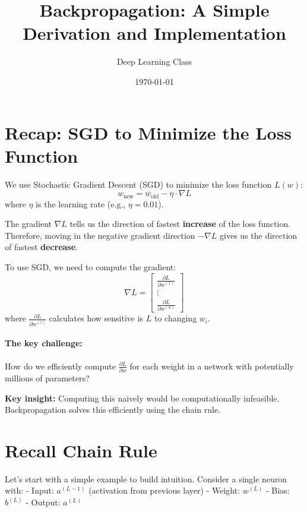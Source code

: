 \documentclass{article}
\title{Backpropagation: A Simple Derivation and Implementation}
\author{Deep Learning Class}
\date{\today}
\begin{document}
\maketitle

\section{Recap: SGD to Minimize the Loss Function}

We use Stochastic Gradient Descent (SGD) to minimize the loss function $L(w)$:
\begin{equation}
    w_{\text{new}} = w_{\text{old}} - \eta \cdot \nabla L
\end{equation}
where $\eta$ is the learning rate (e.g., $\eta = 0.01$).

The gradient $\nabla L$ tells us the direction of fastest \textbf{increase} of the loss function. Therefore, moving in the negative gradient direction $-\nabla L$ gives us the direction of fastest \textbf{decrease}.

To use SGD, we need to compute the gradient:
\begin{equation}
    \nabla L = \begin{bmatrix}
        \frac{\partial L}{\partial w^{(1)}} \\
        \vdots \\
        \frac{\partial L}{\partial w^{(n)}}
    \end{bmatrix}
\end{equation}
where $\frac{\partial L}{\partial w^{(i)}}$ calculates how sensitive is $L$ to changing $w_i$.

\paragraph{The key challenge:} How do we efficiently compute $\frac{\partial L}{\partial w}$ for each weight in a network with potentially millions of parameters? 



\textbf{Key insight:} Computing this naively would be computationally infeasible. Backpropagation solves this efficiently using the chain rule.

\section{Recall Chain Rule}

Let's start with a simple example to build intuition. Consider a single neuron with:
- Input: $a^{(L-1)}$ (activation from previous layer)
- Weight: $w^{(L)}$
- Bias: $b^{(L)}$
- Output: $a^{(L)}$
\end{document}
